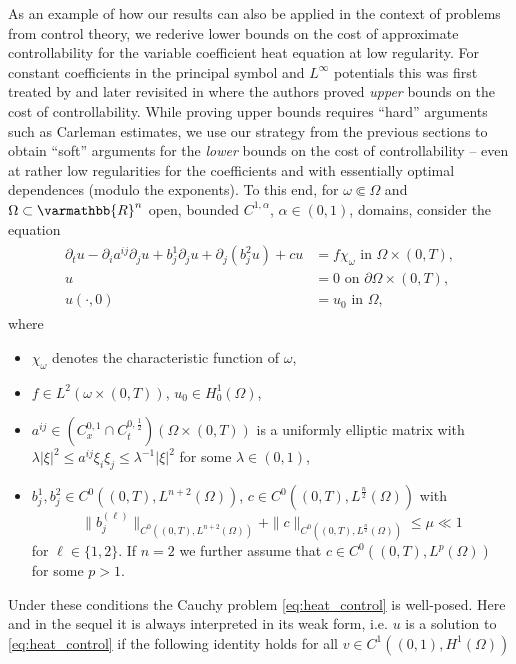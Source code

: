 \documentclass[12pt,twoside]{amsart}
\numberwithin{equation}{section}
\renewcommand{\leq}{\leqslant}
\renewcommand{\mathbb}{\varmathbb}
\newcommand {\R} {\mathbb{R}} \newcommand {\Z} {\mathbb{Z}}
\newcommand {\p} {\partial}
\begin{document}
As an example of how our results can also be applied in the context of problems from control theory, we rederive lower bounds on the cost of approximate controllability for the variable coefficient heat equation at low regularity. For constant coefficients in the principal symbol and $L^{\infty}$ potentials this was first treated by \cite{FernandezCaraZuazua} and later revisited in \cite{Phung} where the authors proved \emph{upper} bounds on the cost of controllability. While proving upper bounds requires ``hard'' arguments such as Carleman estimates, we use our strategy from the previous sections to obtain ``soft'' arguments for the \emph{lower} bounds on the cost of controllability -- even at rather low regularities for the coefficients and with essentially optimal dependences (modulo the exponents). To this end, for $\omega \Subset \Omega $ and $\Omega \subset \R^n$ open, bounded $C^{1,\alpha}$, $\alpha \in (0,1)$, domains, consider the equation
\begin{align}
\label{eq:heat_control}
\begin{split}
\p_t u - \p_i a^{ij}\p_j u + b^1_j \p_j u + \p_j (b^2_j u) + cu & = f \chi_{\omega} \mbox{ in } \Omega \times (0,T),\\
u & = 0 \mbox{ on } \partial \Omega \times (0,T),\\
u(\cdot, 0) &= u_0 \mbox{ in } \Omega,
\end{split}
\end{align}
where 
\begin{itemize}
\item[(i)] $\chi_{\omega}$ denotes the characteristic function of $\omega$, 
\item[(ii)] $f\in L^2(\omega \times (0,T))$, $u_0 \in H^{1}_0(\Omega)$, 
\item[(iii)] $a^{ij} \in (C^{0,1}_x \cap C^{0,\frac{1}{2}}_t)(\Omega \times (0,T))$ is a uniformly elliptic matrix with $\lambda |\xi|^2 \leq a^{ij} \xi_i \xi_j \leq \lambda^{-1} |\xi|^2$ for some $\lambda \in (0,1)$, 
\item[(iv)] $b_j^1 , b_j^2 \in C^0((0,T), L^{n+2}(\Omega)) $, $c\in C^0((0,T), L^{\frac{n}{2}}(\Omega ))$ with $$\|b_j^{(\ell)}\|_{C^0((0,T), L^{n+2}(\Omega))} + \|c\|_{C^0( (0,T), L^{\frac{n}{2}}(\Omega ))} \leq \mu \ll 1$$ for $\ell \in \{1,2\}$. If $n=2$ we further assume that $c \in C^0( (0,T), L^{p}(\Omega ))$ for some $p>1$.
\end{itemize}
Under these conditions the Cauchy problem \eqref{eq:heat_control} is well-posed. Here and in the sequel it is always interpreted in its weak form, i.e. $u$ is a solution to \eqref{eq:heat_control} if the following identity holds for all $v\in C^1((0,1), H^1(\Omega))$
\end{document}
